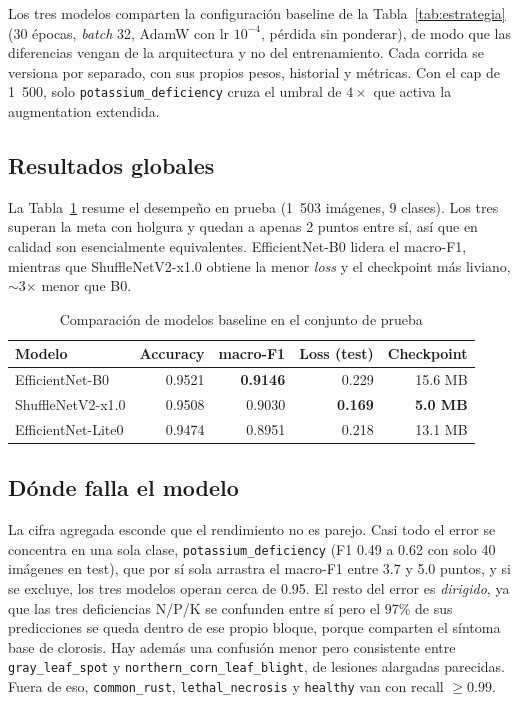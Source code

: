\documentclass[12pt,letterpaper]{article}
\begin{document}
Los tres modelos comparten la configuraci\'on baseline de la Tabla~\ref{tab:estrategia} (30 \'epocas, \textit{batch} 32, AdamW con lr $10^{-4}$, p\'erdida sin ponderar), de modo que las diferencias vengan de la arquitectura y no del entrenamiento. Cada corrida se versiona por separado, con sus propios pesos, historial y m\'etricas. Con el cap de 1~500, solo \texttt{potassium\_deficiency} cruza el umbral de $4\times$ que activa la augmentation extendida.

\subsection{Resultados globales}

La Tabla~\ref{tab:results} resume el desempe\~no en prueba (1~503 im\'agenes, 9 clases). Los tres superan la meta con holgura y quedan a apenas 2 puntos entre s\'i, as\'i que en calidad son esencialmente equivalentes. EfficientNet-B0 lidera el macro-F1, mientras que ShuffleNetV2-x1.0 obtiene la menor \textit{loss} y el checkpoint m\'as liviano, $\sim$3$\times$ menor que B0.

\begin{table}[H]
\caption{Comparaci\'on de modelos baseline en el conjunto de prueba}
\label{tab:results}
\centering
\begin{singlespace}
\begin{tabular}{lrrrr}
\toprule
\textbf{Modelo} & \textbf{Accuracy} & \textbf{macro-F1} & \textbf{Loss (test)} & \textbf{Checkpoint} \\
\midrule
EfficientNet-B0 & 0.9521 & \textbf{0.9146} & 0.229 & 15.6 MB \\
ShuffleNetV2-x1.0 & 0.9508 & 0.9030 & \textbf{0.169} & \textbf{5.0 MB} \\
EfficientNet-Lite0 & 0.9474 & 0.8951 & 0.218 & 13.1 MB \\
\bottomrule
\end{tabular}
\end{singlespace}
\end{table}

\subsection{D\'onde falla el modelo}

La cifra agregada esconde que el rendimiento no es parejo. Casi todo el error se concentra en una sola clase, \texttt{potassium\_deficiency} (F1 0.49 a 0.62 con solo 40 im\'agenes en test), que por s\'i sola arrastra el macro-F1 entre 3.7 y 5.0 puntos, y si se excluye, los tres modelos operan cerca de 0.95. El resto del error es \textit{dirigido}, ya que las tres deficiencias N/P/K se confunden entre s\'i pero el 97\% de sus predicciones se queda dentro de ese propio bloque, porque comparten el s\'intoma base de clorosis. Hay adem\'as una confusi\'on menor pero consistente entre \texttt{gray\_leaf\_spot} y \texttt{northern\_corn\_leaf\_blight}, de lesiones alargadas parecidas. Fuera de eso, \texttt{common\_rust}, \texttt{lethal\_necrosis} y \texttt{healthy} van con recall $\geq0.99$.
\end{document}
